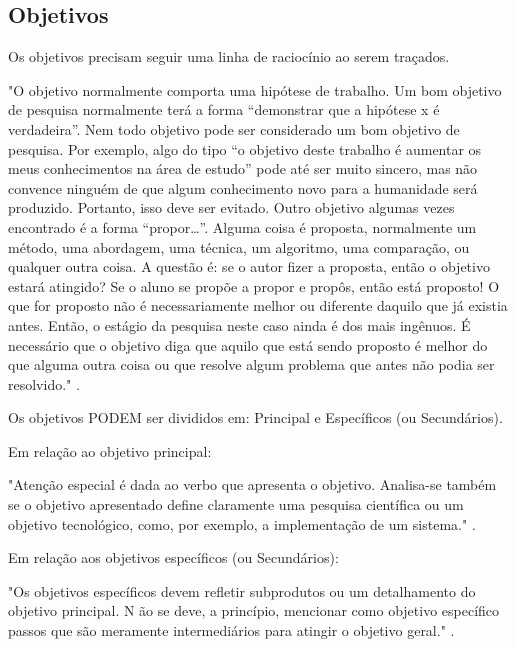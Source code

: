 \documentclass[12pt,a4paper,chapter=TITLE,section=TITLE,subsection=TITLE,subsubsection=TITLE]{article}
\begin{document}
\subsection{Objetivos}

Os objetivos precisam seguir uma linha de raciocínio ao serem traçados.
    \begin{citacao}
    "O objetivo normalmente comporta uma hipótese de trabalho. Um bom objetivo de pesquisa normalmente terá
    a forma “demonstrar que a hipótese x é verdadeira”.
    Nem todo objetivo pode ser considerado um bom objetivo de pesquisa. Por exemplo, algo do tipo “o objetivo
    deste trabalho é aumentar os meus conhecimentos na área de estudo” pode até ser muito sincero, mas não
    convence ninguém de que algum conhecimento novo para a humanidade será produzido. Portanto, isso deve ser evitado.
    Outro objetivo algumas vezes encontrado é a forma “propor…”. Alguma coisa é proposta, normalmente um
    método, uma abordagem, uma técnica, um algoritmo, uma comparação, ou qualquer outra coisa. A questão é:
    se o autor fizer a proposta, então o objetivo estará atingido? Se o aluno se propõe a propor e propôs, então está
    proposto! O que for proposto não é necessariamente melhor ou diferente daquilo que já existia antes. Então, o
    estágio da pesquisa neste caso ainda é dos mais ingênuos.
    É necessário que o objetivo diga que aquilo que está sendo proposto é melhor do que alguma outra coisa ou
    que resolve algum problema que antes não podia ser resolvido."  \cite{PESQUISA:RAUL}.
    \end{citacao}

Os objetivos PODEM ser divididos em: Principal e Específicos (ou Secundários).

Em relação ao objetivo principal:

    \begin{citacao}
    "Atenção especial é dada ao verbo que apresenta o objetivo.
    Analisa-se também se o objetivo apresentado define claramente uma pesquisa científica ou um objetivo
    tecnológico, como, por exemplo, a implementação de um sistema."
    \lipsum[5] \cite{PESQUISA:RAUL}.
    \end{citacao}

Em relação aos objetivos específicos (ou Secundários):

    \begin{citacao}
    "Os objetivos específicos devem refletir subprodutos ou um detalhamento do objetivo principal. N ão se deve, a
    princípio, mencionar como objetivo específico passos que são meramente intermediários para atingir o objetivo
    geral."
    \lipsum[5] \cite{PESQUISA:RAUL}.
    \end{citacao}
\end{document}
